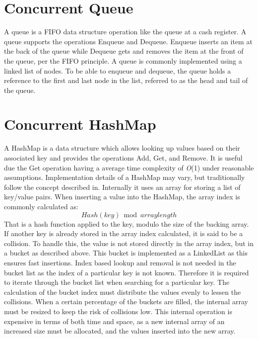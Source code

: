 \section{Concurrent Queue}\label{app:queue}
A queue is a \ac{FIFO} data structure operation like the queue at a cash register\cite[p. 234]{cormen2009introduction}. A queue supports the operations Enqueue and Dequeue. Enqueue inserts an item at the back of the queue while Dequeue gets and removes the item at the front of the queue, per the \ac{FIFO} principle. A queue is commonly implemented using a linked list of nodes\cite[p. 234]{cormen2009introduction}. To be able to enqueue and dequeue, the queue holds a reference to the first and last node in the list, referred to as the head and tail of the queue.
 
\section{Concurrent HashMap}\label{app:hashmap}
A HashMap is a data structure which allows looking up values based on their associated key and provides the operations Add, Get, and Remove. It is useful due the Get operation having a average time complexity of \textit{O}(1) under reasonable assumptions\cite[p. 256]{cormen2009introduction}. Implementation details of a HashMap may vary, but traditionally follow the concept described in\cite[p. 256]{cormen2009introduction}. Internally it uses an array for storing a list of key/value pairs. When inserting a value into the HashMap, the  array index is commonly calculated as:
\begin{equation}
Hash(key) \bmod arraylength
\end{equation}
That is a hash function applied to the key, modulo the size of the backing array. If another key is already stored in the array index calculated, it is said to be a collision. To handle this, the value is not stored directly in the array index, but in a bucket as described above. This bucket is implemented as a LinkedList as this ensures fast insertions\cite[p. 257]{cormen2009introduction}. Index based lookup and removal is not needed in the bucket list as the index of a particular key is not known. Therefore it is required to iterate through the bucket list when searching for a particular key. The calculation of the bucket index must distribute the values evenly to lessen the collisions. When a certain percentage of the buckets are filled, the internal array must be resized to keep the risk of collisions low. This internal operation is expensive in terms of both time and space, as a new internal array of an increased size must be allocated, and the values inserted into the new array.

